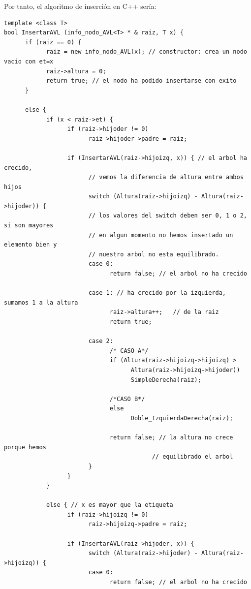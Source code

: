 \documentclass[10pt,a4paper,spanish]{report}
\begin{document}
\noindent
Por tanto, el algoritmo de inserción en C++ sería:

\begin{verbatim}
template <class T>
bool InsertarAVL (info_nodo_AVL<T> * & raiz, T x) {
      if (raiz == 0) {
            raiz = new info_nodo_AVL(x); // constructor: crea un nodo vacio con et=x
            raiz->altura = 0;
            return true; // el nodo ha podido insertarse con exito
      }

      else {
            if (x < raiz->et) {
                  if (raiz->hijoder != 0)
                        raiz->hijoder->padre = raiz;

                  if (InsertarAVL(raiz->hijoizq, x)) { // el arbol ha crecido,
                        // vemos la diferencia de altura entre ambos hijos
                        switch (Altura(raiz->hijoizq) - Altura(raiz->hijoder)) {
                        // los valores del switch deben ser 0, 1 o 2, si son mayores
                        // en algun momento no hemos insertado un elemento bien y
                        // nuestro arbol no esta equilibrado.
                        case 0:
                              return false; // el arbol no ha crecido

                        case 1: // ha crecido por la izquierda, sumamos 1 a la altura
                              raiz->altura++;   // de la raiz
                              return true;

                        case 2:
                              /* CASO A*/
                              if (Altura(raiz->hijoizq->hijoizq) > 
                                    Altura(raiz->hijoizq->hijoder))
                                    SimpleDerecha(raiz);

                              /*CASO B*/
                              else
                                    Doble_IzquierdaDerecha(raiz);

                              return false; // la altura no crece porque hemos 
                                          // equilibrado el arbol
                        }
                  }
            }

            else { // x es mayor que la etiqueta
                  if (raiz->hijoizq != 0)
                        raiz->hijoizq->padre = raiz;

                  if (InsertarAVL(raiz->hijoder, x)) {
                        switch (Altura(raiz->hijoder) - Altura(raiz->hijoizq)) {
                        case 0:
                              return false; // el arbol no ha crecido


\end{verbatim}
\end{document}
